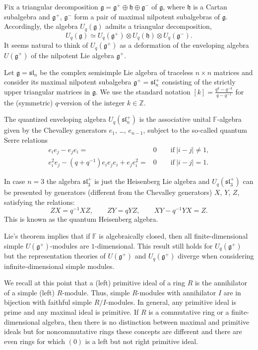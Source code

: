\documentclass{commat}
\newcommand\q{\quad}
\newcommand{\FF}{\mathbb{F}}
\newcommand{\ZZ}{\mathbb{Z}}
\newcommand{\g}{\mathfrak g}
\newcommand{\h}{\mathfrak h}
\newcommand{\fsl}{\mathfrak{sl}}
\begin{document}
Fix a triangular decomposition $\g=\g^+\oplus\h\oplus\g^-$ of $\g$, where $\h$ is a Cartan subalgebra and $\g^+$, $\g^-$ form a pair of maximal nilpotent subalgebras of $\g$. Accordingly, the algebra $U_q(\g)$ admits a triangular decomposition,
\[
U_q(\g)\simeq U_q(\g^+)\otimes U_{q}(\h)\otimes U_q(\g^-).
\] 
It seems natural to think of $U_q(\g^+)$ as a deformation of the enveloping algebra $U(\g^{+})$ of the nilpotent Lie algebra $\g^{+}$. 

Let $\g=\fsl_n$ be the complex semisimple Lie algebra of traceless $n\times n$ matrices and consider its maximal nilpotent subalgebra $\g^{+}=\fsl_n^{+}$ consisting of the strictly upper triangular matrices in $\g$. We use the standard notation $[k]=\frac{q^{k}-q^{-k}}{q-q^{-1}}$ for the (symmetric) $q$-version of the integer $k\in\ZZ$. 

\begin{definition}\label{D:uqsl+}
	The quantized enveloping algebra $U_q(\fsl_n^{+})$ is the associative unital $\FF$-algebra given by the Chevalley generators $e_1$, \ldots, $e_{n-1}$, subject to the so-called quantum Serre relations
	\begin{align}\label{E:bsu:def:qsr}
		e_{i}e_{j} - e_{j}e_{i} =&0 \q\q \text{if}\ \left| i-j \right| \neq 1,\\  \label{E:int:sl:rd:rel2}
		e_{i}^{2}e_{j} -(q + q^{-1})e_{i}e_{j}e_{i} + e_{j}e_{i}^{2}  =&0 \q\q \text{if}\  \left| i-j \right| = 1.
	\end{align} 
\end{definition}

\begin{example}
	In case $n=3$ the algebra $\fsl_3^{+}$ is just the Heisenberg Lie algebra and $U_q(\fsl_3^{+})$ can be presented by generators (different from the Chevalley generators) $X$, $Y$, $Z$, satisfying the relations:
	\begin{equation*}
		ZX=q^{-1}XZ, \q\q ZY=qYZ, \q\q XY-q^{-1}YX=Z.
	\end{equation*}
	This is known as the quantum Heisenberg algebra.
\end{example}

Lie's theorem implies that if $\FF$ is algebraically closed, then all finite-dimensional simple $U(\g^+)$-modules are $1$-dimensional. This result still holds for $U_q(\g^+)$ but the representation theories of $U(\g^+)$ and $U_q(\g^+)$ diverge when considering infinite-dimensional simple modules. 

We recall at this point that a (left) primitive ideal of a ring $R$ is the annihilator of a simple (left) $R$-module. Thus, simple $R$-modules with annihilator $I$ are in bijection with faithful simple $R/I$-modules. In general, any primitive ideal is prime and any maximal ideal is primitive. If $R$ is a commutative ring or a finite-dimensional algebra, then there is no distinction between maximal and primitive ideals but for noncommutative rings these concepts are different and there are even rings for which $(0)$ is a left but not right primitive ideal. 
\end{document}
